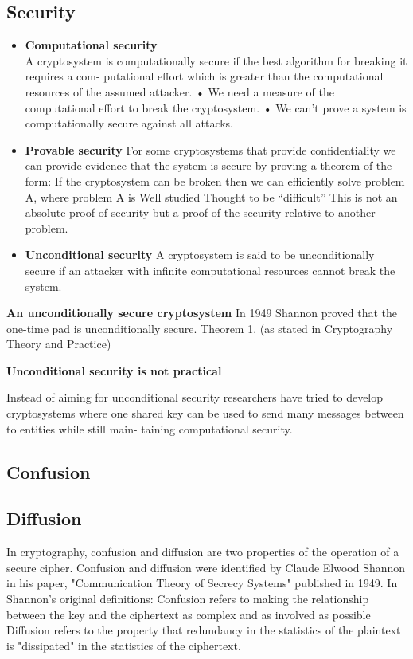 \subsection{Security}
\begin{itemize}
    \item \textbf{Computational security}\\
        A cryptosystem is computationally secure if the best algorithm for breaking it requires a com- putational effort which is greater than the computational resources of the assumed attacker.
        • We need a measure of the computational effort to break the cryptosystem. • We can’t prove a system is computationally secure against all attacks.

    \item \textbf{Provable security}
        For some cryptosystems that provide confidentiality we can provide evidence that the system is secure by proving a theorem of the form:
        If the cryptosystem can be broken then we can efficiently solve problem A, where problem A is
        Well studied
        Thought to be “difficult”
        This is not an absolute proof of security but a proof of the security relative to another problem.

    \item \textbf{Unconditional security}
        A cryptosystem is said to be unconditionally secure if an attacker with infinite computational resources cannot break the system.

\end{itemize}

\textbf{An unconditionally secure cryptosystem}
In 1949 Shannon proved that the one-time pad is unconditionally secure.
Theorem 1.
(as stated in Cryptography Theory and Practice)

\textbf{Unconditional security is not practical}

Instead of aiming for unconditional security researchers have tried to develop cryptosystems where one shared key can be used to send many messages between to entities while still main- taining computational security.


\subsection{Confusion}
\subsection{Diffusion}
In cryptography, confusion and diffusion are two properties of the operation of a secure cipher.
Confusion and diffusion were identified by Claude Elwood Shannon in his paper, "Communication Theory of Secrecy Systems" published in 1949. In Shannon's original definitions:
Confusion refers to making the relationship between the key and the ciphertext as complex and as involved as possible
Diffusion refers to the property that redundancy in the statistics of the plaintext is "dissipated" in the statistics of the ciphertext.

